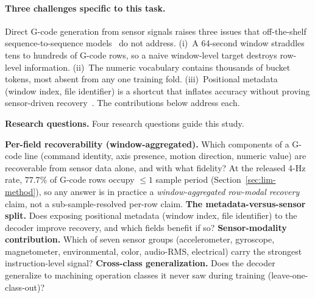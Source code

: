 \documentclass[sensors,article,submit,moreauthors,pdftex]{Definitions/mdpi}
\begin{document}
\paragraph{Three challenges specific to this task.} Direct G-code generation from sensor signals raises three issues that off-the-shelf sequence-to-sequence models~\cite{sutskever2014sequence,bahdanau2014neural,vaswani2017attention,graves2013speech} do not address. (i)~A 64-second window straddles tens to hundreds of G-code rows, so a naive window-level target destroys row-level information. (ii)~The numeric vocabulary contains thousands of bucket tokens, most absent from any one training fold. (iii)~Positional metadata (window index, file identifier) is a shortcut that inflates accuracy without proving sensor-driven recovery~\cite{meyes2019ablation,jia2016deep}. The contributions below address each.

\textbf{Research questions.} Four research questions guide this study.
\begin{enumerate}[label=\textbf{RQ\arabic*.}, leftmargin=*]\let\item\olditem
\item \textbf{Per-field recoverability (window-aggregated).} Which components of a G-code line (command identity, axis presence, motion direction, numeric value) are recoverable from sensor data alone, and with what fidelity? At the released 4-Hz rate, $77.7\%$ of G-code rows occupy $\le\!1$ sample period (Section~\ref{sec:lim-method}), so any answer is in practice a \emph{window-aggregated row-modal recovery} claim, not a sub-sample-resolved per-row claim.
\item \textbf{The metadata-versus-sensor split.} Does exposing positional metadata (window index, file identifier) to the decoder improve recovery, and which fields benefit if so?
\item \textbf{Sensor-modality contribution.} Which of seven sensor groups (accelerometer, gyroscope, magnetometer, environmental, color, audio-RMS, electrical) carry the strongest instruction-level signal?
\item \textbf{Cross-class generalization.} Does the decoder generalize to machining operation classes it never saw during training (leave-one-class-out)?
\end{enumerate}
\end{document}
